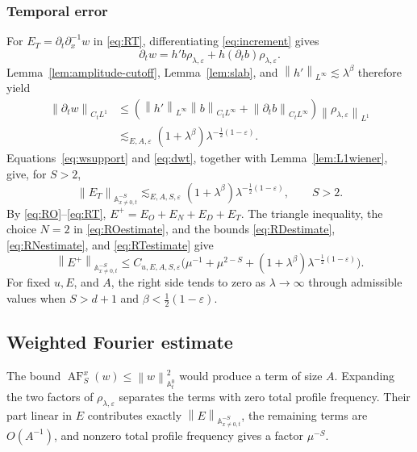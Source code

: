 \documentclass[12pt,reqno,letterpaper]{amsart}
\numberwithin{equation}{section}
\theoremstyle{definition}
\newcommand{\A}{\mathbb A}
\newcommand{\eps}{\varepsilon}
\newcommand{\la}{\lambda}
\newcommand{\norm}[1]{\left\lVert #1\right\rVert}
\begin{document}
\subsubsection*{Temporal error}

For $E_T=\partial_t\partial_x^{-1}w$ in \eqref{eq:RT}, differentiating
\eqref{eq:increment} gives
\[
   \partial_tw=h'b\rho_{\la,\eps}
      +h(\partial_tb)\rho_{\la,\eps}.
\]
Lemma~\ref{lem:amplitude-cutoff}, Lemma~\ref{lem:slab}, and
$\norm{h'}_{L^\infty}\lesssim\la^\beta$ therefore yield
\begin{equation}\label{eq:dwt}
\begin{split}
    \norm{\partial_tw}_{C_tL^1}
    &\leq
       \left(\norm{h'}_{L^\infty}\norm b_{C_tL^\infty}
          +\norm{\partial_tb}_{C_tL^\infty}\right)
          \norm{\rho_{\la,\eps}}_{L^1}\\
    &\lesssim_{E,A,\eps}
       (1+\la^\beta)\la^{-\frac12(1-\eps)}.
\end{split}
\end{equation}
Equations~\eqref{eq:wsupport} and \eqref{eq:dwt}, together with
Lemma~\ref{lem:L1wiener}, give, for $S>2$,
\begin{equation}\label{eq:RTestimate}
    \norm{E_T}_{\A^{-S}_{x\neq0,t}}
    \lesssim_{E,A,S,\eps}
       (1+\la^\beta)\la^{-\frac12(1-\eps)},
    \qquad S>2.
\end{equation}
By \eqref{eq:RO}--\eqref{eq:RT}, $E^+=E_O+E_N+E_D+E_T$.  The triangle
inequality, the choice $N=2$ in \eqref{eq:ROestimate}, and the bounds \eqref{eq:RDestimate},
\eqref{eq:RNestimate}, and \eqref{eq:RTestimate} give
\begin{equation}\label{eq:onestep-total-error}
   \norm{E^+}_{\A^{-S}_{x\neq0,t}}
   \leq C_{u,E,A,S,\eps}\bigl(
       \mu^{-1}+\mu^{2-S}
       +(1+\la^\beta)
          \la^{-\frac12(1-\eps)}\bigr).
\end{equation}
For fixed $u,E$, and $A$, the right side tends to zero as
$\la\to\infty$ through admissible values when $S>d+1$ and
$\beta<\frac12(1-\eps)$.

\subsection{Weighted Fourier estimate}

The bound
$\operatorname{AF}_S^x(w)\leq\norm{w}_{\A_t^0}^2$ would produce a term
of size $A$.  Expanding the two factors of $\rho_{\la,\eps}$ separates
the terms with zero total profile frequency.  Their part linear in $E$
contributes exactly $\norm{E}_{\A^{-S}_{x\neq0,t}}$, the remaining terms
are $O(A^{-1})$, and nonzero total profile frequency gives a factor
$\mu^{-S}$.
\end{document}

